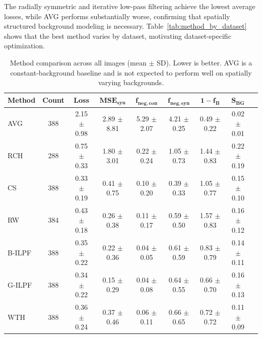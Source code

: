 \documentclass[11pt,onecolumn]{IEEEtran}
\begin{document}
The radially symmetric and iterative low-pass filtering achieve the lowest average losses, while AVG performs substantially worse, confirming that spatially structured background modeling is necessary. Table~\ref{tab:method_by_dataset} shows that the best method varies by dataset, motivating dataset-specific optimization. 




\begin{table}[t]
\caption{Method comparison across all images (mean $\pm$ SD). Lower is better. AVG is a constant-background baseline and is not expected to perform well on spatially varying backgrounds.}

\label{tab:method_performance_new}
\centering
\small
\setlength{\tabcolsep}{3pt}
\renewcommand{\arraystretch}{1.1}
\begin{tabular}{@{}lcccccccc@{}}
\toprule
\textbf{Method} & \textbf{Count} & \textbf{Loss} &
$\mathbf{MSE}_{\mathbf{syn}}$ &
$\mathbf{f}_{\mathbf{neg,con}}$ &
$\mathbf{f}_{\mathbf{neg,syn}}$ &
$\mathbf{1-f_B}$ &
$\mathbf{S}_{\mathbf{BG}}$ \\ \midrule
AVG & 388 & 2.15 $\pm$ 0.98 & 2.89 $\pm$ 8.81 & 5.29 $\pm$ 2.07 & 4.21 $\pm$ 0.25 & 0.49 $\pm$ 0.22 & 0.02 $\pm$ 0.01 \\
RCH & 288 & 0.75 $\pm$ 0.33 & 1.80 $\pm$ 3.01 & 0.22 $\pm$ 0.24 & 1.05 $\pm$ 0.73 & 1.44 $\pm$ 0.83 & 0.22 $\pm$ 0.19 \\
CS & 388 & 0.33 $\pm$ 0.19 & 0.41 $\pm$ 0.75 & 0.10 $\pm$ 0.20 & 0.39 $\pm$ 0.33 & 1.05 $\pm$ 0.77 & 0.15 $\pm$ 0.10 \\
RW & 384 & 0.43 $\pm$ 0.18 & 0.26 $\pm$ 0.38 & 0.11 $\pm$ 0.17 & 0.59 $\pm$ 0.50 & 1.57 $\pm$ 0.83 & 0.16 $\pm$ 0.12 \\
B-ILPF & 388 & 0.35 $\pm$ 0.22 & 0.22 $\pm$ 0.36 & 0.04 $\pm$ 0.05 & 0.61 $\pm$ 0.59 & 0.83 $\pm$ 0.79 & 0.14 $\pm$ 0.11 \\
G-ILPF & 388 & 0.34 $\pm$ 0.22 & 0.15 $\pm$ 0.29 & 0.04 $\pm$ 0.08 & 0.64 $\pm$ 0.55 & 0.66 $\pm$ 0.70 & 0.16 $\pm$ 0.13 \\
WTH & 388 & 0.36 $\pm$ 0.24 & 0.37 $\pm$ 0.46 & 0.06 $\pm$ 0.11 & 0.66 $\pm$ 0.65 & 0.72 $\pm$ 0.72 & 0.11 $\pm$ 0.09 \\
\bottomrule
\end{tabular}
\end{table}
\end{document}
